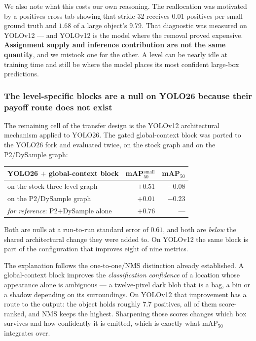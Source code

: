 \documentclass[10pt,twocolumn,a4paper]{article}
\begin{document}
We also note what this costs our own reasoning. The reallocation was motivated
by a positives cross-tab showing that stride 32 receives $0.01$ positives per
small ground truth and $1.68$ of a large object's $9.79$. That diagnostic was
measured on YOLOv12 --- and YOLOv12 is the model where the removal proved
expensive. \textbf{Assignment supply and inference contribution are not the same
quantity}, and we mistook one for the other. A level can be nearly idle at
training time and still be where the model places its most confident large-box
predictions.

\subsubsection{The level-specific blocks are a null on YOLO26 because their
payoff route does not exist}

The remaining cell of the transfer design is the YOLOv12 architectural
mechanism applied to YOLO26. The gated global-context block was ported to the
YOLO26 fork and evaluated twice, on the stock graph and on the P2/DySample
graph:

\begin{center}\small
\begin{tabular}{@{}lrr@{}}
\toprule
YOLO26 $+$ global-context block & mAP$_{50}^{\text{small}}$ & mAP$_{50}$ \\
\midrule
on the stock three-level graph  & $+0.51$ & $-0.08$ \\
on the P2/DySample graph        & $+0.01$ & $-0.23$ \\
\midrule
\emph{for reference}: P2$+$DySample alone & $+0.76$ & --- \\
\bottomrule
\end{tabular}
\end{center}

Both are nulls at a run-to-run standard error of $0.61$, and both are
\emph{below} the shared architectural change they were added to. On YOLOv12 the
same block is part of the configuration that improves eight of nine metrics.

The explanation follows the one-to-one/NMS distinction already established. A
global-context block improves the \emph{classification confidence} of a location
whose appearance alone is ambiguous --- a twelve-pixel dark blob that is a bag,
a bin or a shadow depending on its surroundings. On YOLOv12 that improvement has
a route to the output: the object holds roughly $7.7$ positives, all of them
score-ranked, and NMS keeps the highest. Sharpening those scores changes which
box survives and how confidently it is emitted, which is exactly what
mAP$_{50}$ integrates over.
\end{document}
